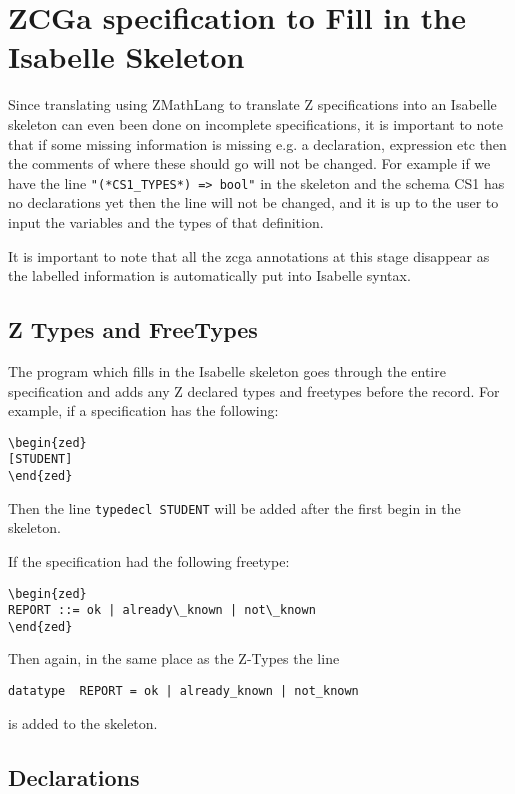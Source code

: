 \section{ZCGa specification to Fill in the Isabelle Skeleton}
\label{sec:zcga2fillin}

Since translating using ZMathLang to translate Z specifications into an Isabelle skeleton can even been done on incomplete specifications, it is important to note that if some missing information is missing e.g. a declaration, expression etc then the comments of where these should go will not be changed. 
For example if we have the line \verb|"(*CS1_TYPES*) => bool"| in the skeleton and the schema CS1 has no declarations yet then the line will not be changed, and it is up to the user to input the variables and the types of that definition.

It is important to note that all the \gls{zcga} annotations at this stage disappear as the labelled information is automatically put into Isabelle syntax.

\subsection{Z Types and FreeTypes}

The program which fills in the Isabelle skeleton goes through the entire specification and adds any Z declared types and freetypes before the record. For example, if a specification has the following:
\begin{verbatim}
\begin{zed}
[STUDENT]
\end{zed}
\end{verbatim}

Then the line \verb|typedecl STUDENT| will be added after the first begin in the skeleton.

If the specification had the following freetype:
\begin{verbatim}
\begin{zed} 
REPORT ::= ok | already\_known | not\_known
\end{zed}
\end{verbatim}

Then again, in the same place as the Z-Types the line
\begin{verbatim}
datatype  REPORT = ok | already_known | not_known
\end{verbatim}
is added to the skeleton.

\subsection{Declarations}


